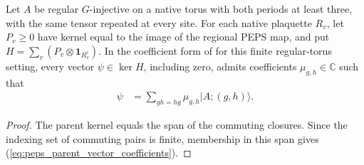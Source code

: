 \begin{lemma}%
    \label{thm:peps_parent_ground_vector_coefficients}
    \leanok
    Let $A$ be regular $G$-injective on a native torus with both periods
    at least three, with the same tensor repeated at every site.
    For each native plaquette $R_v$, let $P_v\geq0$
    have kernel equal to the image of the regional PEPS map, and put
    $H=\sum_v(P_v\otimes\mathbf1_{R_v^c})$.
    In the coefficient form of \cite[Theorem~5.7]{Schuch2010PEPS}
    for this finite regular-torus setting,
    every vector $\psi\in\ker H$, including zero, admits coefficients
    $\mu_{g,h}\in\mathbb C$ such that
    \begin{align}
        \psi & =\sum_{gh=hg}\mu_{g,h}\lvert A;(g,h)\rangle.
        \label{eq:peps_parent_vector_coefficients}
    \end{align}
\end{lemma}
\begin{proof}\leanok
    The parent kernel equals the span of the commuting closures.
    Since the indexing set of commuting pairs is finite, membership
    in this span gives (\ref{eq:peps_parent_vector_coefficients}).
\end{proof}

